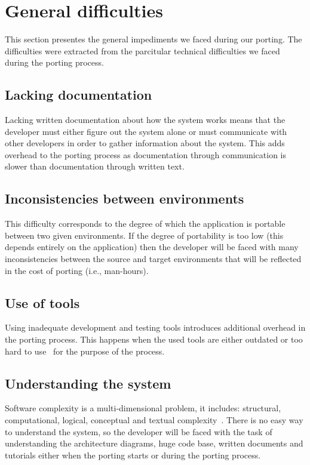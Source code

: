 \section{General difficulties}

This section presentes the general impediments we faced during our porting. The
difficulties were extracted from the parcitular technical difficulties we faced
during the porting process.

\subsection{Lacking documentation}
Lacking written documentation about how the system works means
that the developer must either figure out the system alone or must communicate
with other developers in order to gather information about the system. This adds
overhead to the porting process as documentation through communication is
slower than documentation through written text.

\subsection{Inconsistencies between environments}
This difficulty corresponds to the degree of which the application is
portable~\cite{mooney2004developing} between two given environments. If the
degree of portability is too low (this depends entirely on the application) then
the developer will be faced with many inconsistencies between the source and
target environments that will be reflected in the cost of porting (i.e.,
man-hours).

\subsection{Use of tools}
Using inadequate development and testing tools introduces additional
overhead in the porting process. This happens when the used tools are either
outdated or too hard to use~ 
for the purpose of the process.

\subsection{Understanding the system}
Software complexity is a multi-dimensional problem, it includes: structural,
computational, logical, conceptual and textual complexity~\cite{ejiogu}. There
is no easy way to understand the system, so the developer will be faced with the
task of understanding the architecture diagrams, huge code base, written
documents and tutorials either when the porting starts or during the porting
process.


